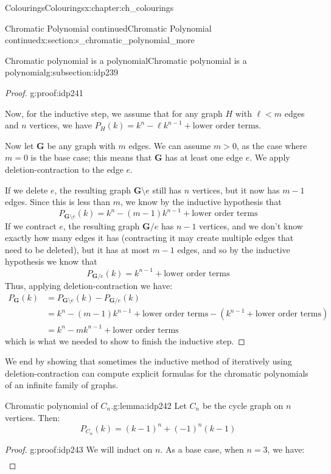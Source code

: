 \documentclass[oneside,10pt,]{book}
\numberwithin{equation}{section}
\newcommand{\bfG}{\mathbf{G}}
\newcommand{\lt}{<}
\newcommand{\gt}{>}
\newcommand{\amp}{&}
\begin{document}
\begin{chapterptx}{Colourings}{}{Colourings}{}{}{x:chapter:ch_colourings}
\begin{sectionptx}{Chromatic Polynomial continued}{}{Chromatic Polynomial continued}{}{}{x:section:s_chromatic_polynomial_more}
\begin{subsectionptx}{Chromatic polynomial is a polynomial}{}{Chromatic polynomial is a polynomial}{}{}{g:subsection:idp239}
\begin{proof}{}{g:proof:idp241}
\par
Now, for the inductive step, we assume that for any graph \(H\) with \(\ell\lt m\) edges and \(n\) vertices, we have \(P_{H}(k)=k^n-\ell k^{n-1}+\text{lower order terms}\).%
\par
Now let \(\bfG\) be any graph with \(m\) edges.  We can assume \(m\gt 0\), as the case where \(m=0\) is the base case; this means that \(\bfG\) has at least one edge \(e\).  We apply deletion-contraction to the edge \(e\).%
\par
If we delete \(e\), the resulting graph \(\bfG\setminus e\) still has \(n\) vertices, but it now has \(m-1\) edges.  Since this is less than \(m\), we know by the inductive hypothesis that%
%
\begin{equation*}
P_{\bfG\setminus e}(k)=k^n-(m-1)k^{n-1}+\text{lower order terms}
\end{equation*}
If we contract \(e\), the resulting graph \(\bfG/e\) has \(n-1\) vertices, and we don't know exactly how many edges it has (contracting it may create multiple edges that need to be deleted), but it has at most \(m-1\) edges, and so by the inductive hypothesis we know that%
%
\begin{equation*}
P_{\bfG/e}(k)=k^{n-1}+\text{lower order terms}
\end{equation*}
Thus, applying deletion-contraction we have:%
%
\begin{align*}
P_\bfG(k) \amp = P_{\bfG\setminus e}(k)-P_{\bfG/e}(k) \\
\amp = k^n-(m-1)k^{n-1}+\text{lower order terms} - \left(k^{n-1}+\text{lower order terms} \right)\\
\amp = k^n-mk^{n-1}+\text{lower order terms}
\end{align*}
which is what we needed to show to finish the inductive step.%
\end{proof}
We end by showing that sometimes the inductive method of iteratively using deletion-contraction can compute explicit formulas for the chromatic polynomials of an infinite family of graphs.%
\begin{lemma}{Chromatic polynomial of \(C_n\).}{}{g:lemma:idp242}%
Let \(C_n\) be the cycle graph on \(n\) vertices.  Then:%
%
\begin{equation*}
P_{C_n}(k) = (k-1)^n+(-1)^n(k-1)
\end{equation*}
\end{lemma}
\begin{proof}{}{g:proof:idp243}
We will induct on \(n\).  As a base case, when \(n=3\), we have:%
%
\begin{align*}

\end{align*}
\end{proof}
\end{subsectionptx}
\end{sectionptx}
\end{chapterptx}
\end{document}
